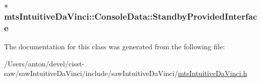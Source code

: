 \subsubsection[{Standby\+Provided\+Interface}]{$\ast$ mts\+Intuitive\+Da\+Vinci\+::\+Console\+Data\+::\+Standby\+Provided\+Interface}\label{classmts_intuitive_da_vinci_1_1_console_data_a42526431899b8d287072e9db9a7f6e0e}


The documentation for this class was generated from the following file\+:\begin{DoxyCompactItemize}
\item 
/\+Users/anton/devel/cisst-\/saw/saw\+Intuitive\+Da\+Vinci/include/saw\+Intuitive\+Da\+Vinci/\hyperlink{mts_intuitive_da_vinci_8h}{mts\+Intuitive\+Da\+Vinci.\+h}\end{DoxyCompactItemize}
